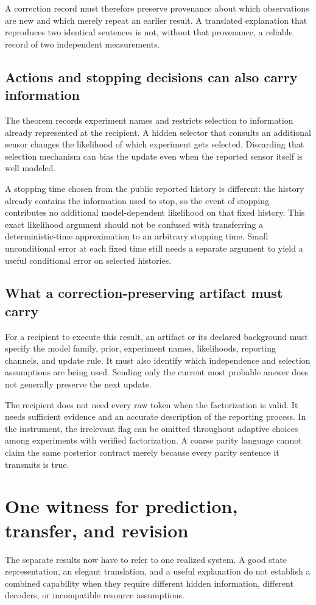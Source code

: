 \documentclass[11pt,letterpaper]{article}
\theoremstyle{plain}
\theoremstyle{definition}
\begin{document}
A correction record must therefore preserve provenance about which observations are new and which merely repeat an earlier result. A translated explanation that reproduces two identical sentences is not, without that provenance, a reliable record of two independent measurements.

\subsection{Actions and stopping decisions can also carry information}
The theorem records experiment names and restricts selection to information already represented at the recipient. A hidden selector that consults an additional sensor changes the likelihood of which experiment gets selected. Discarding that selection mechanism can bias the update even when the reported sensor itself is well modeled.

A stopping time chosen from the public reported history is different: the history already contains the information used to stop, so the event of stopping contributes no additional model-dependent likelihood on that fixed history. This exact likelihood argument should not be confused with transferring a deterministic-time approximation to an arbitrary stopping time. Small unconditional error at each fixed time still needs a separate argument to yield a useful conditional error on selected histories.

\subsection{What a correction-preserving artifact must carry}
For a recipient to execute this result, an artifact or its declared background must specify the model family, prior, experiment names, likelihoods, reporting channels, and update rule. It must also identify which independence and selection assumptions are being used. Sending only the current most probable answer does not generally preserve the next update.

The recipient does not need every raw token when the factorization is valid. It needs sufficient evidence and an accurate description of the reporting process. In the instrument, the irrelevant flag can be omitted throughout adaptive choices among experiments with verified factorization. A coarse parity language cannot claim the same posterior contract merely because every parity sentence it transmits is true.


\section{One witness for prediction, transfer, and revision}\label{sec:witness}
The separate results now have to refer to one realized system. A good state representation, an elegant translation, and a useful explanation do not establish a combined capability when they require different hidden information, different decoders, or incompatible resource assumptions.
\end{document}
